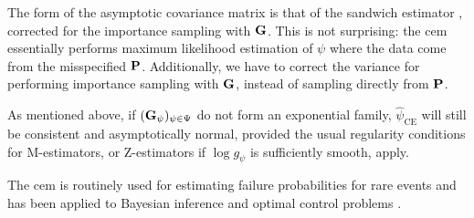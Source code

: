 The form of the asymptotic covariance matrix is that of the sandwich estimator \citep{White1982Maximum}, corrected for the importance sampling with $\G$. This is not surprising: the \acrshort{cem} essentially performs maximum likelihood estimation of $\psi$ where the data come from the misspecified $\P$. Additionally, we have to correct the variance for performing importance sampling with $\G$, instead of sampling directly from $\P$.

As mentioned above, if $(\G_\psi)_{\psi \in \Psi}$ do not form an exponential family, $\hat\psi_{\text{CE}}$ will still be consistent and asymptotically normal, provided the usual regularity conditions for M-estimators, or Z-estimators if $\log g_{\psi}$ is sufficiently smooth, apply. 



The \gls{cem} is routinely used for estimating failure probabilities for rare events \citep{Homem-de-Mello2007Study} and has been applied to Bayesian inference \citep{Engel2023Bayesian,Ehre2023Certified} and optimal control problems \citep{Kappen2016Adaptive,Zhang2014Applications}.
